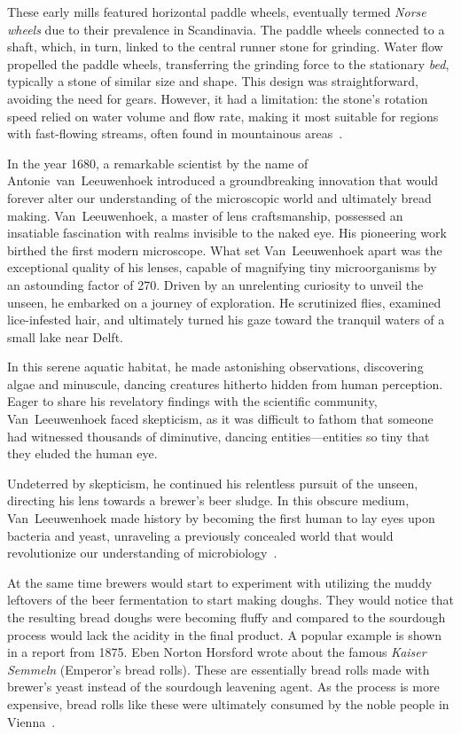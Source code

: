 These early mills featured horizontal paddle wheels, eventually termed
\emph{Norse wheels} due to their prevalence in Scandinavia.  The paddle wheels
connected to a shaft, which, in turn, linked to the central runner stone for
grinding. Water flow propelled the paddle wheels, transferring the grinding
force to the stationary \emph{bed}, typically a stone of similar size and
shape. This design was straightforward, avoiding the need for gears. However,
it had a limitation: the stone's rotation speed relied on water volume and
flow rate, making it most suitable for regions with fast-flowing streams,
often found in mountainous areas~\cite{mills+scandinavia}.

In the year \num{1680}, a remarkable scientist by the name of
Antonie~van~Leeuwenhoek introduced a groundbreaking innovation that would
forever alter our understanding of the microscopic world and ultimately bread
making.  Van~Leeuwenhoek, a master of lens craftsmanship, possessed an
insatiable fascination with realms invisible to the naked eye. His pioneering
work birthed the first modern microscope.  What set Van~Leeuwenhoek apart was
the exceptional quality of his lenses, capable of magnifying tiny
microorganisms by an astounding factor of \num{270}.  Driven by an unrelenting
curiosity to unveil the unseen, he embarked on a journey of exploration. He
scrutinized flies, examined lice-infested hair, and ultimately turned his gaze
toward the tranquil waters of a small lake near Delft.

In this serene aquatic habitat, he made astonishing observations, discovering
algae and minuscule, dancing creatures hitherto hidden from human perception.
Eager to share his revelatory findings with the scientific community,
Van~Leeuwenhoek faced skepticism, as it was difficult to fathom that someone
had witnessed thousands of diminutive, dancing entities—entities so tiny that
they eluded the human eye.

Undeterred by skepticism, he continued his relentless pursuit of the unseen,
directing his lens towards a brewer's beer sludge. In this obscure medium,
Van~Leeuwenhoek made history by becoming the first human to lay eyes upon
bacteria and yeast, unraveling a previously concealed world that would
revolutionize our understanding of microbiology~\cite{Yong+2017+Leeuwen}.

At the same time brewers would start to experiment with utilizing the muddy
leftovers of the beer fermentation to start making doughs. They would notice
that the resulting bread doughs were becoming fluffy and compared
to the sourdough process would lack the acidity in the final product.
A popular example is shown in a report from \num{1875}. Eben Norton Horsford
wrote about the famous \emph{Kaiser Semmeln} (Emperor's bread rolls).
These are essentially bread rolls made with brewer's yeast instead
of the sourdough leavening agent. As the process is more expensive,
bread rolls like these were ultimately consumed by the noble people
in Vienna~\cite{vienna+breadrolls}.

